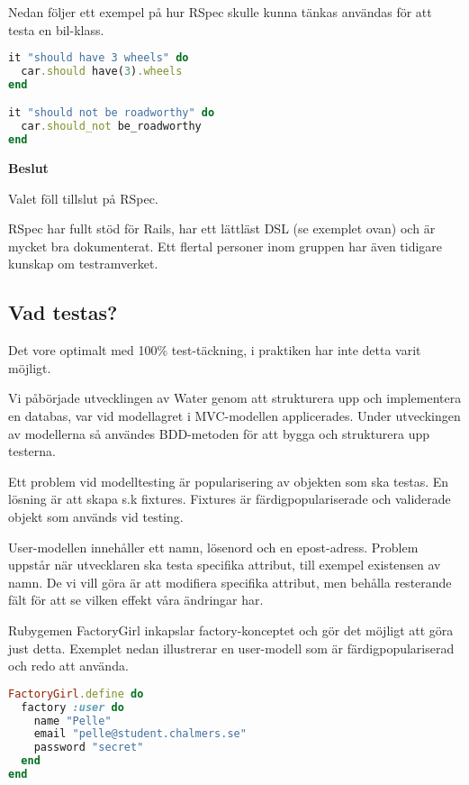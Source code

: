 Nedan följer ett exempel på hur RSpec skulle kunna tänkas användas för att testa en bil-klass.

\begin{lstlisting}[language=Ruby, showstringspaces=false]
it "should have 3 wheels" do
  car.should have(3).wheels
end

it "should not be roadworthy" do
  car.should_not be_roadworthy
end
\end{lstlisting}

\begin{flushright}
  
  \textbf{Beslut}
  
    Valet föll tillslut på RSpec.

    RSpec har fullt stöd för Rails, har ett lättläst DSL (se exemplet ovan) och är mycket bra dokumenterat. Ett flertal personer inom gruppen har även tidigare kunskap om testramverket.
\end{flushright}

\subsection{Vad testas?}
Det vore optimalt med 100\% test-täckning, i praktiken har inte detta varit möjligt.

Vi påbörjade utvecklingen av Water genom att strukturera upp och implementera en databas, var vid modellagret i MVC-modellen applicerades. Under utveckingen av modellerna så användes BDD-metoden för att bygga och strukturera upp testerna. 

Ett problem vid modelltesting är popularisering av objekten som ska testas. En lösning är att skapa s.k fixtures. Fixtures är färdigpopulariserade och validerade objekt som används vid testing.

User-modellen innehåller ett namn, lösenord och en epost-adress. Problem uppstår när utvecklaren ska testa specifika attribut, till exempel existensen av namn. De vi vill göra är att modifiera specifika attribut, men behålla resterande fält för att se vilken effekt våra ändringar har.

Rubygemen FactoryGirl inkapslar factory-konceptet och gör det möjligt att göra just detta. Exemplet nedan illustrerar en user-modell som är färdigpopulariserad och redo att använda.

\begin{lstlisting}[language=Ruby]
FactoryGirl.define do
  factory :user do
    name "Pelle"
    email "pelle@student.chalmers.se"
    password "secret"
  end
end
\end{lstlisting}


